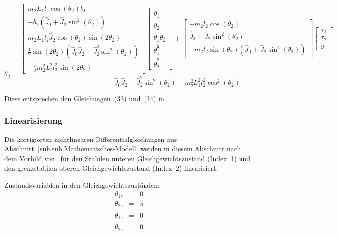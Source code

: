 \begin{equation}
\ddot{\theta}_2 =
\frac{
\begin{bmatrix}
m_2L_1l_2\cos(\theta_2)b_1 \\ 
-b_2(\hat{J}_0+\hat{J}_2\sin^2(\theta_2)) \\ 
m_2L_1l_2\hat{J}_2\cos(\theta_2)\sin(2\theta_2) \\ 
\frac{1}{2}\sin(2\theta_2)(\hat{J}_0\hat{J}_2+\hat{J}^2_2\sin^2(\theta_2)) \\ 
-\frac{1}{2}m^2_2L^2_1l^2_2\sin(2\theta_2)
\end{bmatrix}
\begin{bmatrix}
\dot{\theta}_1 \\ 
\dot{\theta}_2 \\ 
\dot{\theta}_1\dot{\theta}_2 \\ 
\dot{\theta}^2_1 \\ 
\dot{\theta}^2_2
\end{bmatrix}
+
\begin{bmatrix}
-m_2l_2\cos(\theta_2) \\ 
\hat{J}_0+\hat{J}_2\sin^2(\theta_2) \\ 
-m_2l_2\sin(\theta_2)(\hat{J}_0+\hat{J}_2\sin^2(\theta_2))
\end{bmatrix}
\begin{bmatrix}
\tau_1 \\ 
\tau_2 \\ 
g
\end{bmatrix} }
{\hat{J}_0\hat{J}_2+\hat{J}^2_2\sin^2(\theta_2)-m^2_2L^2_1l^2_2\cos^2(\theta_2)}
\end{equation}

Diese entsprechen den Gleichungen~(33) und~(34) in~\cite{Cazzolato.2011}

\subsubsection{Linearisierung}
\label{sub.sub.Linearisierung}
Die korrigierten nichtlinearen Differentialgleichungen aus Abschnitt~\ref{sub.sub.Mathematisches-Modell} werden in diesem Abschnitt nach dem Vorbild von~\cite{Cazzolato.2011} für den Stabilen unteren Gleichgewichtszustand (Index~1) und den grenz\-stabilen oberen Gleichgewichtszustand (Index~2) linearisiert.

Zustandsvariablen in den Gleichgewichtszuständen:
\begin{eqnarray}
\theta_{1e} &=& 0		\nonumber \\
\theta_{2e} &=& \pi	\nonumber \\
\dot{\theta}_{1e} &=& 0		\nonumber \\
\dot{\theta}_{2e} &=& 0	
\end{eqnarray}

